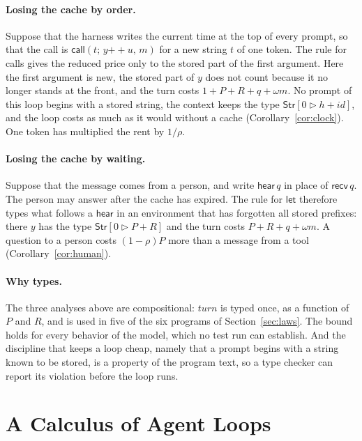 \documentclass[acmsmall,nonacm,screen]{acmart}
\newcommand{\kw}[1]{\mathsf{#1}}
\newcommand{\Str}[2]{\kw{Str}[#1 \triangleright #2]}
\newcommand{\cat}{\mathbin{+\!\!+}}
\newcommand{\recv}[1]{\kw{recv}\,#1}
\newcommand{\hear}[1]{\kw{hear}\,#1}
\newcommand{\call}[3]{\kw{call}(#1;\,#2,\,#3)}
\newcommand{\nm}[1]{\mathit{#1}}
\newcommand{\turn}{\nm{turn}}
\begin{document}
\paragraph{Losing the cache by order.} Suppose that the harness writes the current time at the
top of every prompt, so that the call is $\call{t}{y \cat u}{m}$ for a new string $t$ of one
token. The rule for calls gives the reduced price only to the stored part of the first
argument. Here the first argument is new, the stored part of $y$ does not count because it no
longer stands at the front, and the turn costs $1 + P + R + q + \omega m$. No prompt of this
loop begins with a stored string, the context keeps the type $\Str{0}{h + id}$, and the loop
costs as much as it would without a cache (Corollary~\ref{cor:clock}). One token has multiplied
the rent by $1/\rho$.

\paragraph{Losing the cache by waiting.} Suppose that the message comes from a person, and
write $\hear{q}$ in place of $\recv{q}$. The person may answer after the cache has expired. The
rule for $\kw{let}$ therefore types what follows a $\kw{hear}$ in an environment that has
forgotten all stored prefixes: there $y$ has the type $\Str{0}{P+R}$ and the turn costs
$P + R + q + \omega m$. A question to a person costs $(1-\rho)P$ more than a message from a
tool (Corollary~\ref{cor:human}).

\paragraph{Why types.} The three analyses above are compositional: $\turn$ is typed once, as a
function of $P$ and $R$, and is used in five of the six programs of Section~\ref{sec:laws}. The
bound holds for every behavior of the model, which no test run can establish. And the
discipline that keeps a loop cheap, namely that a prompt begins with a string known to be
stored, is a property of the program text, so a type checker can report its violation before
the loop runs.

\section{A Calculus of Agent Loops}
\label{sec:calculus}
\end{document}
